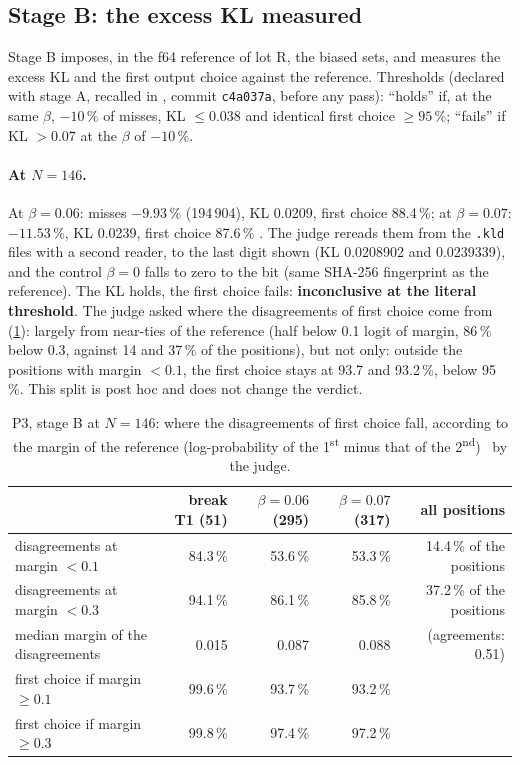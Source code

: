 \subsection{Stage B: the excess KL measured}\label{t3mim:sec:p3-etageB}

Stage B imposes, in the f64 reference of lot R, the biased sets, and measures the excess KL and the first output choice against the reference. Thresholds (declared with stage A, recalled in , commit \texttt{c4a037a}, before any pass): ``holds'' if, at the same $\beta$, $-10\,\%$ of misses, KL $\le 0.038$ and identical first choice $\ge 95\,\%$; ``fails'' if KL $> 0.07$ at the $\beta$ of $-10\,\%$.

\paragraph{At $N = 146$.} At $\beta = 0.06$: misses $-9.93\,\%$ (194\,904), KL 0.0209, first choice 88.4\,\%; at $\beta = 0.07$: $-11.53\,\%$, KL 0.0239, first choice 87.6\,\% \mes. The judge rereads them from the \texttt{.kld} files with a second reader, to the last digit shown (KL 0.0208902 and 0.0239339), and the control $\beta = 0$ falls to zero to the bit (same SHA-256 fingerprint as the reference). The KL holds, the first choice fails: \textbf{inconclusive at the literal threshold}. The judge asked where the disagreements of first choice come from (\cref{t3mim:tab:p3-quasi}): largely from near-ties of the reference (half below 0.1 logit of margin, 86\,\% below 0.3, against 14 and 37\,\% of the positions), but not only: outside the positions with margin $< 0.1$, the first choice stays at 93.7 and 93.2\,\%, below 95\,\%. This split is post hoc and does not change the verdict.

\begin{table}[tbp]
\centering\small
\caption[P3, stage B at $N = 146$: the disagreements of first choice]{P3, stage B at $N = 146$: where the disagreements of first choice fall, according to the margin of the reference (log-probability of the 1\textsuperscript{st} minus that of the 2\textsuperscript{nd}) \mes~by the judge.}
\label{t3mim:tab:p3-quasi}
\setlength{\tabcolsep}{4pt}
\begin{tabular}{@{}lrrrr@{}}
\toprule
& break T1 (51) & $\beta = 0.06$ (295) & $\beta = 0.07$ (317) & all positions \\
\midrule
disagreements at margin $< 0.1$ & 84.3\,\% & 53.6\,\% & 53.3\,\% & 14.4\,\% of the positions \\
disagreements at margin $< 0.3$ & 94.1\,\% & 86.1\,\% & 85.8\,\% & 37.2\,\% of the positions \\
median margin of the disagreements & 0.015 & 0.087 & 0.088 & (agreements: 0.51) \\
first choice if margin $\ge 0.1$ & 99.6\,\% & 93.7\,\% & 93.2\,\% & \\
first choice if margin $\ge 0.3$ & 99.8\,\% & 97.4\,\% & 97.2\,\% & \\
\bottomrule
\end{tabular}
\end{table}

